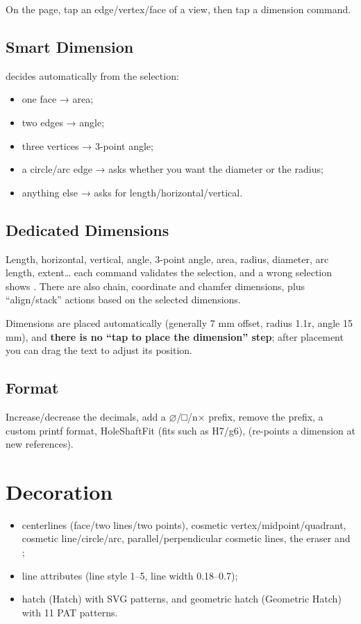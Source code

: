 On the page, tap an edge/vertex/face of a view, then tap a dimension command.

\subsection{Smart Dimension}

 decides automatically from the selection:

\begin{itemize}
  \item one face → area;
  \item two edges → angle;
  \item three vertices → 3-point angle;
  \item a circle/arc edge → asks whether you want the diameter or the radius;
  \item anything else → asks for length/horizontal/vertical.
\end{itemize}

\subsection{Dedicated Dimensions}

Length, horizontal, vertical, angle, 3-point angle, area, radius, diameter, arc length, extent… each
command validates the selection, and a wrong selection shows
. There are also chain, coordinate and chamfer dimensions, plus
``align/stack'' actions based on the selected dimensions.

Dimensions are placed automatically (generally 7 mm offset, radius 1.1r, angle 15 mm), and
\textbf{there is no ``tap to place the dimension'' step}; after placement you can drag the text to
adjust its position.

\subsection{Format}

Increase/decrease the decimals, add a ⌀/□/n× prefix, remove the prefix, a custom printf format,
HoleShaftFit (fits such as H7/g6),  (re-points a dimension at new
references).

\section{Decoration}

\begin{itemize}
  \item centerlines (face/two lines/two points), cosmetic vertex/midpoint/quadrant, cosmetic
        line/circle/arc, parallel/perpendicular cosmetic lines, the eraser and ;
  \item line attributes (line style 1--5, line width 0.18--0.7);
  \item hatch (Hatch) with SVG patterns, and geometric hatch (Geometric Hatch) with 11 PAT patterns.
\end{itemize}

